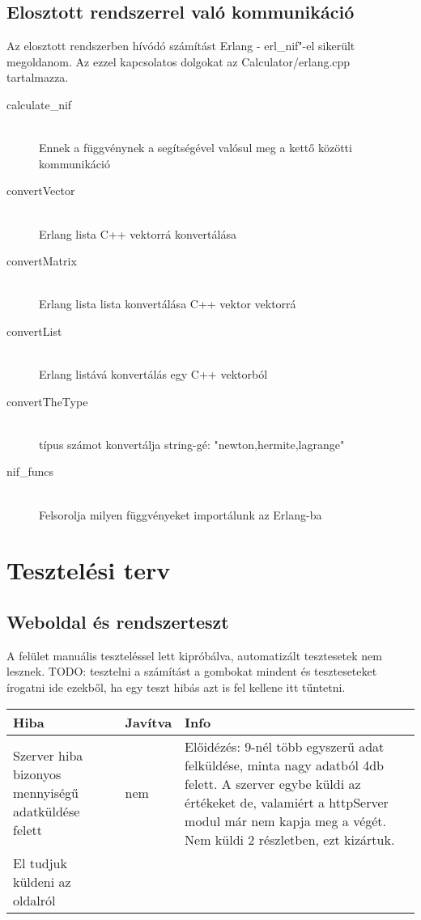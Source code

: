 \subsection{Elosztott rendszerrel való kommunikáció}
	Az elosztott rendszerben hívódó számítást Erlang - erl\_nif"-el sikerült megoldanom. 
	Az ezzel kapcsolatos dolgokat az Calculator/erlang.cpp tartalmazza.
	\begin{description}
		\item[calculate\_nif] \hfill \\
		Ennek a függvénynek a segítségével valósul meg a kettő közötti kommunikáció
		\item[convertVector] \hfill \\
		Erlang lista C++ vektorrá konvertálása
		\item[convertMatrix] \hfill \\
		Erlang lista lista konvertálása C++ vektor vektorrá
		\item[convertList] \hfill \\
		Erlang listává konvertálás egy C++ vektorból
		\item[convertTheType] \hfill \\
			típus számot konvertálja string-gé: 
			"newton,hermite,lagrange"
		\item[nif\_funcs] \hfill \\
			Felsorolja milyen függvényeket importálunk az Erlang-ba
	\end{description}

\section{Tesztelési terv}
\subsection{Weboldal és rendszerteszt}
	A felület manuális teszteléssel lett kipróbálva, automatizált tesztesetek nem lesznek.
	TODO: tesztelni a számítást a gombokat mindent és teszteseteket írogatni ide ezekből, 
	ha egy teszt hibás azt is fel kellene itt tűntetni.
	\begin{center}
  \begin{tabular}{| p{4cm} | p{1.5cm} | p{8cm} |}
    \hline
    Hiba & Javítva & Info
    \\ \hline
    	Szerver hiba bizonyos mennyiségű adatküldése felett 
      &
    	nem
      &  
    	Előidézés: 9-nél több egyszerű adat felküldése, minta nagy adatból 4db felett.
    	A szerver egybe küldi az értékeket de, valamiért a httpServer modul már nem kapja meg a végét. Nem küldi 2 részletben, ezt kizártuk.
    \\ \hline
    	El tudjuk küldeni az oldalról 
      &

      &

    \\ \hline
  \end{tabular}
\end{center}
